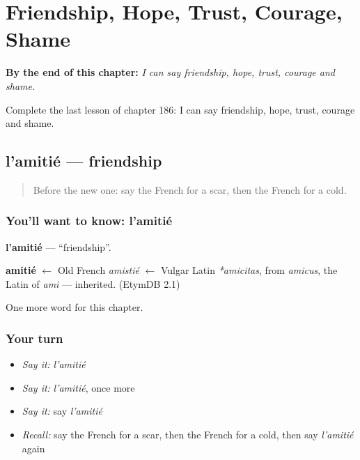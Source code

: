 
\chapter{Friendship, Hope, Trust, Courage, Shame}
\label{ch:fr-friendship-hope-trust-courage-shame}

\begin{chapteropening}
\textbf{By the end of this chapter:} \emph{I can say friendship, hope, trust, courage and shame.}

Complete the last lesson of chapter 186: I can say friendship, hope, trust, courage and shame.
\end{chapteropening}

\section[l'amitié]{l'amitié — friendship}

\label{lesson:FR-C186-amitie}



\begin{quote}
Before the new one: say the French for a scar, then the French for a cold.
\end{quote}

\subsection*{You'll want to know: l'amitié}
\textbf{l'amitié} — \textquotedblleft{}friendship\textquotedblright{}.

\begin{cousinweb}
\textbf{amitié} $\leftarrow$ Old French \emph{amistié} $\leftarrow$ Vulgar Latin \emph{*amicitas}, from \emph{amicus}, the Latin of \emph{ami} — inherited. (EtymDB 2.1)
\end{cousinweb}

\begin{grammarlens}[title={What you've built}]
One more word for this chapter.
\end{grammarlens}

\subsection*{Your turn}
\begin{itemize}
\raggedright
  \item \emph{Say it:} \emph{l'amitié}
  \item \emph{Say it:} \emph{l'amitié}, once more
  \item \emph{Say it:} say \emph{l'amitié}
  \item \emph{Recall:} say the French for a scar, then the French for a cold, then say \emph{l'amitié} again
\end{itemize}

